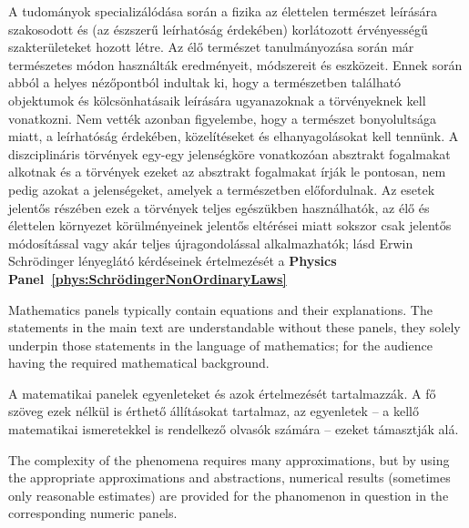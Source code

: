 {
A tudományok specializálódása során a fizika az élettelen természet 
leírására szakosodott és (az észszerű leírhatóság érdekében)
korlátozott érvényességű szakterületeket hozott létre.
Az élő természet tanulmányozása során már természetes módon
használták eredményeit, módszereit és eszközeit.
Ennek során abból a helyes nézőpontból indultak ki, hogy
a természetben található objektumok és kölcsönhatásaik leírására
ugyanazoknak a törvényeknek kell vonatkozni. Nem vették azonban figyelembe, hogy a természet bonyolultsága miatt,
a leírhatóság érdekében, közelítéseket és elhanyagolásokat kell tennünk. A diszciplináris törvények egy-egy jelenségköre vonatkozóan
absztrakt fogalmakat alkotnak és a törvények ezeket az absztrakt
fogalmakat írják le pontosan, nem pedig azokat a jelenségeket,
amelyek a természetben előfordulnak. Az esetek jelentős részében
ezek a törvények teljes egészükben használhatók, 
az élő és élettelen környezet körülményeinek jelentős eltérései miatt
sokszor csak jelentős módosítással vagy akár teljes újragondolással alkalmazhatók; lásd Erwin Schrödinger lényeglátó kérdéseinek értelmezését
a \textbf{Physics Panel~\ref{phys:SchrödingerNonOrdinaryLaws}} 
}
\fi


\ifx\magyar\undefined

{
Mathematics panels typically contain equations and 
their explanations. The statements in the main text 
are understandable without these panels, they solely underpin
those statements in the language of mathematics;
for the audience having the required mathematical background.
}

\else

{
A matematikai panelek egyenleteket és azok értelmezését tartalmazzák. A fő szöveg ezek nélkül is érthető állításokat tartalmaz, az egyenletek -- a kellő matematikai ismeretekkel
is rendelkező olvasók számára -- ezeket támasztják alá.
}

\fi

\ifx\magyar\undefined

{
The complexity of the phenomena requires many approximations, but by using the appropriate approximations and abstractions,  numerical results (sometimes only reasonable estimates) are provided for the phanomenon in question in the corresponding numeric panels.
}
\else

